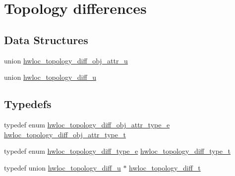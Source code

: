\hypertarget{a00225}{}\section{Topology differences}
\label{a00225}
\subsection*{Data Structures}
\begin{DoxyCompactItemize}
\item 
union \hyperlink{a00334}{hwloc\+\_\+topology\+\_\+diff\+\_\+obj\+\_\+attr\+\_\+u}
\item 
union \hyperlink{a00350}{hwloc\+\_\+topology\+\_\+diff\+\_\+u}
\end{DoxyCompactItemize}
\subsection*{Typedefs}
\begin{DoxyCompactItemize}
\item 
typedef enum \hyperlink{a00225_ga86f044210b0a9e9fa83acbdbbf7e05fd}{hwloc\+\_\+topology\+\_\+diff\+\_\+obj\+\_\+attr\+\_\+type\+\_\+e} \hyperlink{a00225_ga5f2dd099de2cacdc0d0d4858154b971a}{hwloc\+\_\+topology\+\_\+diff\+\_\+obj\+\_\+attr\+\_\+type\+\_\+t}
\item 
typedef enum \hyperlink{a00225_ga38b28b7423b85a3321e6d0062d5f83d0}{hwloc\+\_\+topology\+\_\+diff\+\_\+type\+\_\+e} \hyperlink{a00225_ga4b86adb00c8b2d09ebc4ef8f3bfd92b2}{hwloc\+\_\+topology\+\_\+diff\+\_\+type\+\_\+t}
\item 
typedef union \hyperlink{a00350}{hwloc\+\_\+topology\+\_\+diff\+\_\+u} $\ast$ \hyperlink{a00225_ga2cf1b17332fe5d95f2198f6340cfd288}{hwloc\+\_\+topology\+\_\+diff\+\_\+t}
\end{DoxyCompactItemize}
